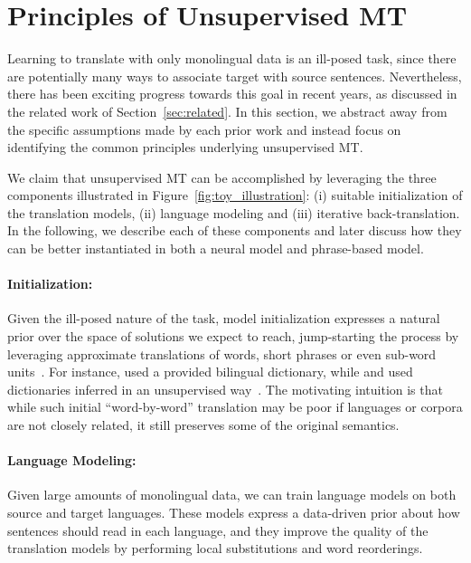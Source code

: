 \documentclass[11pt,a4paper]{article}
\begin{document}
\section{Principles of Unsupervised MT} 
\label{sec:principles}

Learning to translate with only monolingual data is an ill-posed task, since there are potentially many ways to associate target with source sentences.
Nevertheless, there has been exciting progress towards this goal in recent years, as discussed in the related work of Section~\ref{sec:related}.
In this section, we abstract away from the specific assumptions made by each prior work and instead focus on identifying the common principles underlying unsupervised MT.

We claim that unsupervised MT can be accomplished by leveraging the three components illustrated in Figure~\ref{fig:toy_illustration}:
(i) suitable initialization of the translation models, (ii) language modeling and (iii) iterative back-translation. In the following, we describe each of these components and later discuss how they can be better instantiated in both a neural model and phrase-based model.

\paragraph{Initialization: }
Given the ill-posed nature of the task, model initialization expresses a natural prior over the space of solutions we expect to reach, jump-starting 
the process by leveraging approximate translations of words, short phrases or even sub-word units~\cite{sennrich2015neural}. For instance, \citet{klementiev12EACL} used a provided bilingual dictionary, while \citet{unsupNMTlample} and \citet{unsupNMTartetxe} used dictionaries inferred in an unsupervised way~\cite{wordalign17, artetxeWord17}. The motivating intuition is that
while such initial ``word-by-word'' translation may be poor if languages or corpora are not closely related, it still preserves some of the original semantics.

\paragraph{Language Modeling: } Given large amounts of monolingual data, we can train language models on both source and target languages. These models express a data-driven prior about how sentences should read in each language, and they improve the quality of the translation models by performing local substitutions and word reorderings.
\end{document}
